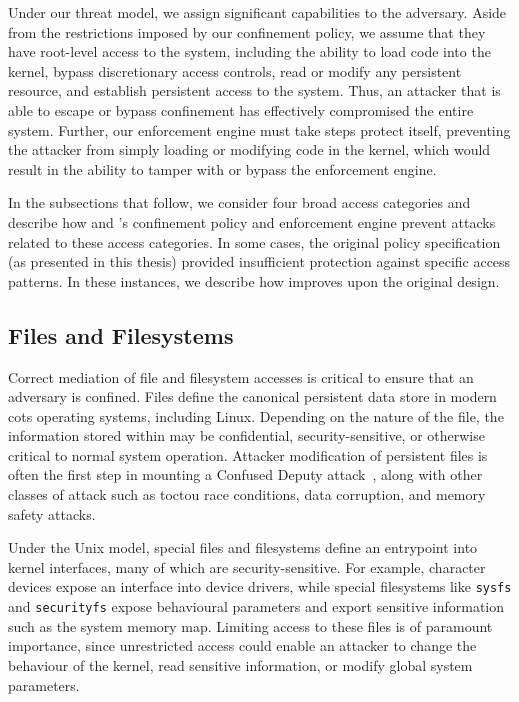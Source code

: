 Under our threat model, we assign significant capabilities to the adversary. Aside from the
restrictions imposed by our confinement policy, we assume that they have root-level access
to the system, including the ability to load code into the kernel, bypass discretionary
access controls, read or modify any persistent resource, and establish persistent access
to the system. Thus, an attacker that is able to escape or bypass confinement has
effectively compromised the entire system. Further, our enforcement engine must take steps
protect itself, preventing the attacker from simply loading or modifying code in the
kernel, which would result in the ability to tamper with or bypass the enforcement engine.

In the subsections that follow, we consider four broad access categories and describe how
\bpfbox{} and \bpfcontain{}'s confinement policy and enforcement engine prevent attacks
related to these access categories. In some cases, the original \bpfbox{} policy
specification (as presented in this thesis) provided insufficient protection against
specific access patterns. In these instances, we describe how \bpfcontain{} improves upon
the original \bpfbox{} design.

\subsection{Files and Filesystems}

Correct mediation of file and filesystem accesses is critical to ensure that an adversary
is confined. Files define the canonical persistent data store in modern \gls{cots}
operating systems, including Linux. Depending on the nature of the file, the information
stored within may be confidential, security-sensitive, or otherwise critical to normal
system operation. Attacker modification of persistent files is often the first step in
mounting a Confused Deputy attack~\cite{hardy1988_confused_deputy}, along with other
classes of attack such as \gls{toctou} race conditions, data corruption, and memory safety
attacks.

Under the Unix model, special files and filesystems define an entrypoint into kernel
interfaces, many of which are security-sensitive. For example, character devices expose an
interface into device drivers, while special filesystems like \texttt{sysfs} and
\texttt{securityfs} expose behavioural parameters and export sensitive information such as
the system memory map. Limiting access to these files is of paramount importance, since
unrestricted access could enable an attacker to change the behaviour of the kernel, read
sensitive information, or modify global system parameters.

